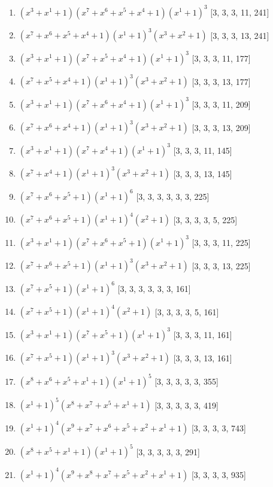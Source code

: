 \documentclass[10pt,twocolumn]{article}
\begin{document}
\begin{enumerate}
\item $(x^{3} + x^{1} + 1)(x^{7} + x^{6} + x^{5} + x^{4} + 1)(x^{1} + 1)^{3}$  [3, 3, 3, 11, 241]
\item $(x^{7} + x^{6} + x^{5} + x^{4} + 1)(x^{1} + 1)^{3}(x^{3} + x^{2} + 1)$  [3, 3, 3, 13, 241]
\item $(x^{3} + x^{1} + 1)(x^{7} + x^{5} + x^{4} + 1)(x^{1} + 1)^{3}$  [3, 3, 3, 11, 177]
\item $(x^{7} + x^{5} + x^{4} + 1)(x^{1} + 1)^{3}(x^{3} + x^{2} + 1)$  [3, 3, 3, 13, 177]
\item $(x^{3} + x^{1} + 1)(x^{7} + x^{6} + x^{4} + 1)(x^{1} + 1)^{3}$  [3, 3, 3, 11, 209]
\item $(x^{7} + x^{6} + x^{4} + 1)(x^{1} + 1)^{3}(x^{3} + x^{2} + 1)$  [3, 3, 3, 13, 209]
\item $(x^{3} + x^{1} + 1)(x^{7} + x^{4} + 1)(x^{1} + 1)^{3}$  [3, 3, 3, 11, 145]
\item $(x^{7} + x^{4} + 1)(x^{1} + 1)^{3}(x^{3} + x^{2} + 1)$  [3, 3, 3, 13, 145]
\item $(x^{7} + x^{6} + x^{5} + 1)(x^{1} + 1)^{6}$  [3, 3, 3, 3, 3, 3, 225]
\item $(x^{7} + x^{6} + x^{5} + 1)(x^{1} + 1)^{4}(x^{2} + 1)$  [3, 3, 3, 3, 5, 225]
\item $(x^{3} + x^{1} + 1)(x^{7} + x^{6} + x^{5} + 1)(x^{1} + 1)^{3}$  [3, 3, 3, 11, 225]
\item $(x^{7} + x^{6} + x^{5} + 1)(x^{1} + 1)^{3}(x^{3} + x^{2} + 1)$  [3, 3, 3, 13, 225]
\item $(x^{7} + x^{5} + 1)(x^{1} + 1)^{6}$  [3, 3, 3, 3, 3, 3, 161]
\item $(x^{7} + x^{5} + 1)(x^{1} + 1)^{4}(x^{2} + 1)$  [3, 3, 3, 3, 5, 161]
\item $(x^{3} + x^{1} + 1)(x^{7} + x^{5} + 1)(x^{1} + 1)^{3}$  [3, 3, 3, 11, 161]
\item $(x^{7} + x^{5} + 1)(x^{1} + 1)^{3}(x^{3} + x^{2} + 1)$  [3, 3, 3, 13, 161]
\item $(x^{8} + x^{6} + x^{5} + x^{1} + 1)(x^{1} + 1)^{5}$  [3, 3, 3, 3, 3, 355]
\item $(x^{1} + 1)^{5}(x^{8} + x^{7} + x^{5} + x^{1} + 1)$  [3, 3, 3, 3, 3, 419]
\item $(x^{1} + 1)^{4}(x^{9} + x^{7} + x^{6} + x^{5} + x^{2} + x^{1} + 1)$  [3, 3, 3, 3, 743]
\item $(x^{8} + x^{5} + x^{1} + 1)(x^{1} + 1)^{5}$  [3, 3, 3, 3, 3, 291]
\item $(x^{1} + 1)^{4}(x^{9} + x^{8} + x^{7} + x^{5} + x^{2} + x^{1} + 1)$  [3, 3, 3, 3, 935]

\end{enumerate}
\end{document}

